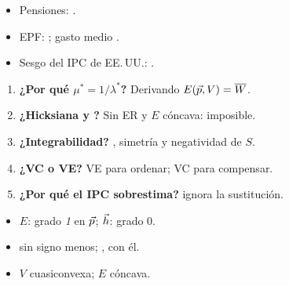 \documentclass{article}
\begin{document}
\begin{columnas}
\anexorepaso
{}
\begin{itemize}
\item Pensiones: .
\item EPF: ; gasto medio .
\item Sesgo del IPC de EE.\,UU.: .
\end{itemize}
\begin{enumerate}
\item \textbf{¿Por qué $\mu^*=1/\lambda^*$?} Derivando $E(\vec{p},V)=\overline{W}$.
\item \textbf{¿Hicksiana y ?} Sin ER y $E$ cóncava: imposible.
\item \textbf{¿Integrabilidad?} , simetría y negatividad de $S$.
\item \textbf{¿VC o VE?} VE para ordenar; VC para compensar.
\item \textbf{¿Por qué el IPC sobrestima?}  ignora la sustitución.
\end{enumerate}
\begin{trampa}
\begin{itemize}
\item $E$: grado \emph{1} en $\vec{p}$; $\vec{h}$: grado 0.
\item {} sin signo menos; , con él.
\item $V$ cuasiconvexa; $E$ cóncava.
\end{itemize}
\end{trampa}

\end{columnas}
\end{document}
